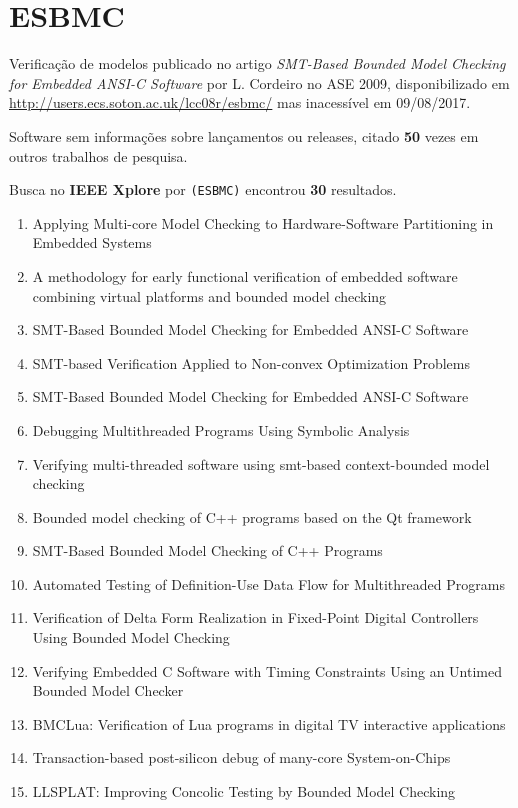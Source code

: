 \section{ESBMC}

Verificação de modelos
publicado no artigo {\it SMT-Based Bounded Model Checking for Embedded ANSI-C Software}
por L. Cordeiro
no ASE 2009,
disponibilizado em \url{http://users.ecs.soton.ac.uk/lcc08r/esbmc/}
mas inacessível em 09/08/2017.

Software sem informações sobre lançamentos ou releases,
citado {\bf 50} vezes em outros trabalhos de pesquisa.

Busca no {\bf IEEE Xplore} por
\texttt{(ESBMC)}
encontrou {\bf 30}
resultados.

\begin{enumerate}
\item Applying Multi-core Model Checking to Hardware-Software Partitioning in Embedded Systems
\item A methodology for early functional verification of embedded software combining virtual platforms and bounded model checking
\item SMT-Based Bounded Model Checking for Embedded ANSI-C Software
\item SMT-based Verification Applied to Non-convex Optimization Problems
\item SMT-Based Bounded Model Checking for Embedded ANSI-C Software
\item Debugging Multithreaded Programs Using Symbolic Analysis
\item Verifying multi-threaded software using smt-based context-bounded model checking
\item Bounded model checking of C++ programs based on the Qt framework
\item SMT-Based Bounded Model Checking of C++ Programs
\item Automated Testing of Definition-Use Data Flow for Multithreaded Programs
\item Verification of Delta Form Realization in Fixed-Point Digital Controllers Using Bounded Model Checking
\item Verifying Embedded C Software with Timing Constraints Using an Untimed Bounded Model Checker
\item BMCLua: Verification of Lua programs in digital TV interactive applications
\item Transaction-based post-silicon debug of many-core System-on-Chips
\item LLSPLAT: Improving Concolic Testing by Bounded Model Checking

\end{enumerate}
